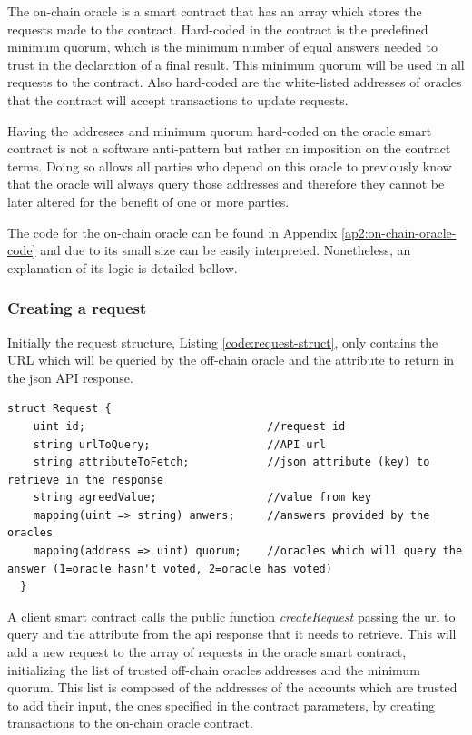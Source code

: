 The on-chain oracle is a smart contract that has an array which stores the requests made to the contract. Hard-coded in the contract is the predefined minimum quorum, which is the minimum number of equal answers needed to trust in the declaration of a final result. This minimum quorum will be used in all requests to the contract. Also hard-coded are the white-listed addresses of oracles that the contract will accept transactions to update requests.

Having the addresses and minimum quorum hard-coded on the oracle smart contract is not a software anti-pattern but rather an imposition on the contract terms. Doing so allows all parties who depend on this oracle to previously know that the oracle will always query those addresses and therefore they cannot be later altered for the benefit of one or more parties.

The code for the on-chain oracle can be found in Appendix \ref{ap2:on-chain-oracle-code} and due to its small size can be easily interpreted. Nonetheless, an explanation of its logic is detailed bellow.

\subsubsection{Creating a request}

Initially the request structure, Listing \ref{code:request-struct}, only contains the URL which will be queried by the off-chain oracle and the attribute to return in the json API response.


\begin{lstlisting}[language=Solidity, label=code:request-struct, caption={Structure that holds information regarding each request.}]
  struct Request {
    uint id;                            //request id
    string urlToQuery;                  //API url
    string attributeToFetch;            //json attribute (key) to retrieve in the response
    string agreedValue;                 //value from key
    mapping(uint => string) anwers;     //answers provided by the oracles
    mapping(address => uint) quorum;    //oracles which will query the answer (1=oracle hasn't voted, 2=oracle has voted)
  }
\end{lstlisting}



A client smart contract calls the public function \textit{createRequest}
passing the url to query and the attribute from the api response that it needs to retrieve. This will add a new request to the array of requests in the oracle smart contract, initializing the list of trusted off-chain oracles addresses and the minimum quorum. This list is composed of the addresses of the accounts which are trusted to add their input, the ones specified in the contract parameters, by creating transactions to the on-chain oracle contract.

